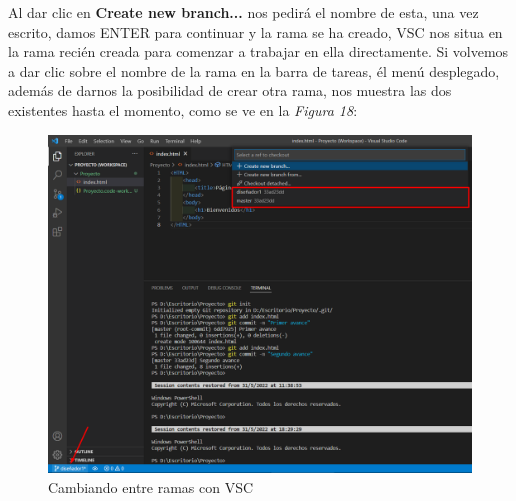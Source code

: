 \begin{enumerate}
    Al dar clic en \textbf{Create new branch...} nos pedirá el nombre de esta, una vez escrito, damos ENTER para continuar y la rama se ha creado, VSC nos situa en la rama recién creada para comenzar a trabajar en ella directamente. Si volvemos a dar clic sobre el nombre de la rama en la barra de tareas, él menú desplegado, además de darnos la posibilidad de crear otra rama, nos muestra las dos existentes hasta el momento, como se ve en la \textit{Figura 18}:
    \begin{figure}[H]
        \begin{center}
            \caption{Cambiando entre ramas con VSC}
            \label{fig: 18}
            \includegraphics[width=\textwidth]{capturas/abriendo_b1.png}
        \end{center}
    \end{figure}
    

\end{enumerate}
